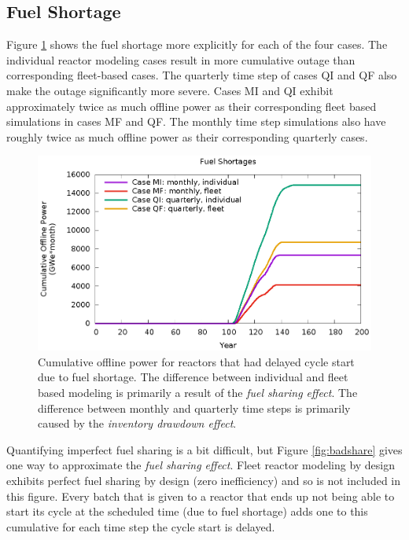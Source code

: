 \documentclass{style}
\begin{document}
\subsection{Fuel Shortage}

Figure \ref{fig:unfueled} shows the fuel shortage more explicitly for each of
the four cases. The individual reactor modeling cases result in more
cumulative outage than corresponding fleet-based cases. The quarterly time
step of cases QI and QF also make the outage significantly more severe. Cases MI
and QI exhibit approximately twice as much offline power as their corresponding
fleet based simulations in cases MF and QF.  The monthly time step simulations
also have roughly twice as much offline power as their corresponding quarterly
cases.

\begin{figure}[!h]
    \centering
    \includegraphics[width=1.0\columnwidth]{exp2/unfueled.eps}
    \caption[Cumulative offline power due to fuel shortage]{
        Cumulative offline power for reactors that had delayed cycle start due
        to fuel shortage. The difference between individual and fleet based
        modeling is primarily a result of the \emph{fuel sharing effect}. The
        difference between monthly and quarterly time steps is primarily
        caused by the \emph{inventory drawdown effect}.
    }
    \label{fig:unfueled}
\end{figure}

Quantifying imperfect fuel sharing is a bit difficult, but Figure
\ref{fig:badshare} gives one way to approximate the \emph{fuel
sharing effect}.  Fleet reactor modeling by design exhibits perfect fuel
sharing by design (zero inefficiency) and so is not included in this figure.
Every batch that is given to a reactor that ends up not being able to start its
cycle at the scheduled time (due to fuel shortage) adds one to this cumulative
for each time step the cycle start is delayed.
\end{document}

